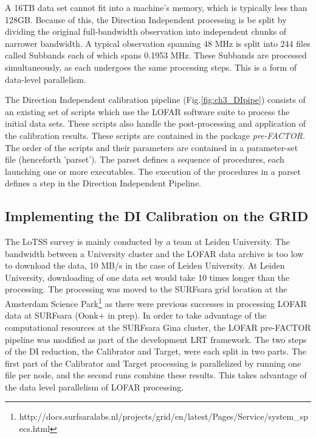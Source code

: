 A 16TB data set cannot fit into a machine's memory, which is typically less than 128GB. Because of this,  the Direction Independent processing is be split by dividing the original full-bandwidth observation into independent chunks of narrower bandwidth. A typical observation spanning 48 MHz is split into 244 files called Subbands each of which spans 0.1953 MHz.  These Subbands are processed simultaneously, as each undergoes the same processing steps. This is a form of data-level parallelism. 


The Direction Independent calibration pipeline (Fig.\ref{fig:ch3_DIpipe}) consists of an existing set of scripts which use the LOFAR software suite\cite{lofarcookbook} to process the initial data sets. These scripts also handle the post-processing and application of the calibration results\cite{van2016lofar}. These scripts are contained in the package \emph{pre-FACTOR}\cite{prefactor}. The order of the scripts and their parameters are contained in a parameter-set file (henceforth 'parset'). The parset defines a sequence of procedures, each launching one or more executables. The execution of the procedures in a parset defines a step in the Direction Independent Pipeline. 


\subsection{Implementing the DI Calibration on the GRID}\label{sec:ch3_impl}

The LoTSS survey is mainly conducted by a team at Leiden University. The bandwidth between a University cluster and the LOFAR data archive is too low to download the data, 10 MB/s in the case of Leiden University. At Leiden University, downloading of one data set would take 10 times longer than the processing. The processing  was moved to the SURFsara grid location at the Amsterdam Science Park\footnote{http://docs.surfsaralabs.nl/projects/grid/en/latest/Pages/Service/system\_specs.html} as there were previous successes in processing LOFAR data at SURFsara (Oonk+ in prep).  In order to take advantage of the computational resources at the SURFsara Gina cluster\cite{gina_specs}, the LOFAR pre-FACTOR pipeline was modified as part of the development LRT framework. The two steps of the DI reduction, the Calibrator and Target, were each split in two parts. The first part of the Calibrator and Target processing is parallelized by running one file per node, and the second runs combine these results. This takes advantage of the data level parallelism of LOFAR processing.

